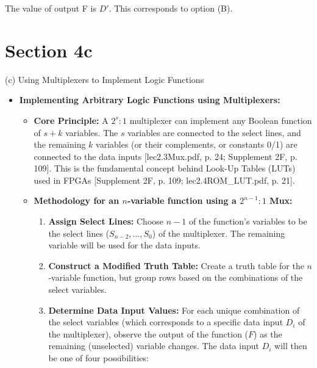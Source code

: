 \documentclass{article}
\begin{document}
\begin{itemize}
The value of output F is $D'$. This corresponds to option (B).

\section{Section 4c}

(c) Using Multiplexers to Implement Logic Functions

\begin{itemize}
    \item \textbf{Implementing Arbitrary Logic Functions using Multiplexers:}
    \begin{itemize}
        \item \textbf{Core Principle:} A $2^s:1$ multiplexer can implement any Boolean function of $s+k$ variables. The $s$ variables are connected to the select lines, and the remaining $k$ variables (or their complements, or constants 0/1) are connected to the data inputs [lec2.3Mux.pdf, p. 24; Supplement 2F, p. 109]. This is the fundamental concept behind Look-Up Tables (LUTs) used in FPGAs [Supplement 2F, p. 109; lec2.4ROM\_LUT.pdf, p. 21].
        \item \textbf{Methodology for an $n$-variable function using a $2^{n-1}:1$ Mux:}
        \begin{enumerate}
            \item \textbf{Assign Select Lines:} Choose $n-1$ of the function's variables to be the select lines ($S_{n-2}, \ldots, S_0$) of the multiplexer. The remaining variable will be used for the data inputs.
            \item \textbf{Construct a Modified Truth Table:} Create a truth table for the $n$-variable function, but group rows based on the combinations of the select variables.
            \item \textbf{Determine Data Input Values:} For each unique combination of the select variables (which corresponds to a specific data input $D_i$ of the multiplexer), observe the output of the function ($F$) as the remaining (unselected) variable changes. The data input $D_i$ will then be one of four possibilities:
\end{enumerate}
\end{itemize}
\end{itemize}
\end{itemize}
\end{document}
